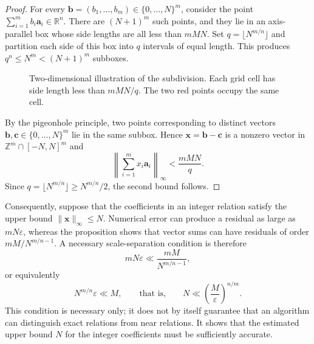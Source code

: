 \documentclass{weeklyprogress}
\begin{document}
\begin{proof}
For every $\bm{b}=(b_1,\ldots,b_m)\in\{0,\ldots,N\}^m$, consider the point $\sum_{i=1}^m b_i\bm{a}_i\in\mathbb{R}^n$. There are $(N+1)^m$ such points, and they lie in an axis-parallel box whose side lengths are all less than $mMN$. Set $q=\lfloor N^{m/n}\rfloor$ and partition each side of this box into $q$ intervals of equal length. This produces $q^n\leq N^m<(N+1)^m$ subboxes.

\begin{figure}[ht]
  \centering
  \caption{Two-dimensional illustration of the subdivision. Each grid cell has side length less than $mMN/q$. The two red points occupy the same cell.}
\end{figure}

By the pigeonhole principle, two points corresponding to distinct vectors $\bm{b},\bm{c}\in\{0,\ldots,N\}^m$ lie in the same subbox. Hence $\bm{x}=\bm{b}-\bm{c}$ is a nonzero vector in $\mathbb{Z}^m\cap[-N,N]^m$ and
\[ \left\lVert\sum_{i=1}^m x_i\bm{a}_i\right\rVert_\infty<\frac{mMN}{q}. \]
Since $q=\lfloor N^{m/n}\rfloor\geq N^{m/n}/2$, the second bound follows.
\end{proof}

Consequently, suppose that the coefficients in an integer relation satisfy the upper bound $\lVert\bm{x}\rVert_\infty\leq N$. Numerical error can produce a residual as large as $mN\varepsilon$, whereas the proposition shows that vector sums can have residuals of order $mM/N^{m/n-1}$. A necessary scale-separation condition is therefore
\[ mN\varepsilon\ll\frac{mM}{N^{m/n-1}}, \]
or equivalently
\[ N^{m/n}\varepsilon\ll M,\qquad\text{that is,}\qquad N\ll\left(\frac{M}{\varepsilon}\right)^{n/m}. \]
This condition is necessary only; it does not by itself guarantee that an algorithm can distinguish exact relations from near relations. It shows that the estimated upper bound $N$ for the integer coefficients must be sufficiently accurate.
\end{document}
